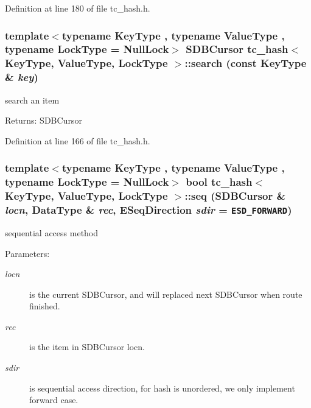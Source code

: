 Definition at line 180 of file tc\_\-hash.h.\hypertarget{classtc__hash_996ea5e3297bcbce4c6a7a0ca8e17d21}{
\subsubsection[{search}]{\setlength{\rightskip}{0pt plus 5cm}template$<$typename KeyType , typename ValueType , typename LockType  = NullLock$>$ SDBCursor {\bf tc\_\-hash}$<$ KeyType, ValueType, LockType $>$::search (const KeyType \& {\em key})}}
\label{classtc__hash_996ea5e3297bcbce4c6a7a0ca8e17d21}


search an item

\begin{Desc}
\item[Returns:]SDBCursor \end{Desc}


Definition at line 166 of file tc\_\-hash.h.\hypertarget{classtc__hash_25d62cc64ce4c777c279101dca5aa846}{
\subsubsection[{seq}]{\setlength{\rightskip}{0pt plus 5cm}template$<$typename KeyType , typename ValueType , typename LockType  = NullLock$>$ bool {\bf tc\_\-hash}$<$ KeyType, ValueType, LockType $>$::seq (SDBCursor \& {\em locn}, \/  DataType \& {\em rec}, \/  ESeqDirection {\em sdir} = {\tt ESD\_\-FORWARD})}}
\label{classtc__hash_25d62cc64ce4c777c279101dca5aa846}


sequential access method 

\begin{Desc}
\item[Parameters:]
\begin{description}
\item[{\em locn}]is the current SDBCursor, and will replaced next SDBCursor when route finished. \item[{\em rec}]is the item in SDBCursor locn. \item[{\em sdir}]is sequential access direction, for hash is unordered, we only implement forward case. \end{description}
\end{Desc}



